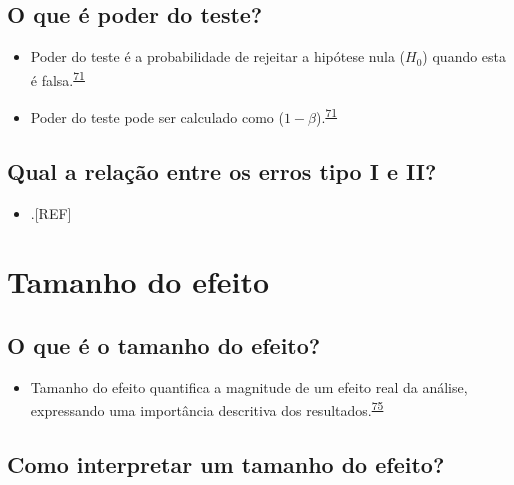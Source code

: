 \documentclass[
]{book}
\providecommand{\tightlist}{%
  \setlength{\itemsep}{0pt}\setlength{\parskip}{0pt}}
\begin{document}
\hypertarget{o-que-uxe9-poder-do-teste}{%
\subsection{O que é poder do teste?}\label{o-que-uxe9-poder-do-teste}}

\begin{itemize}
\item
  Poder do teste é a probabilidade de rejeitar a hipótese nula (\(H_{0}\)) quando esta é falsa.\textsuperscript{\protect\hyperlink{ref-Curran-Everett2009}{71}}
\item
  Poder do teste pode ser calculado como (\(1 - \beta\)).\textsuperscript{\protect\hyperlink{ref-Curran-Everett2009}{71}}
\end{itemize}

\hypertarget{qual-a-relauxe7uxe3o-entre-os-erros-tipo-i-e-ii}{%
\subsection{Qual a relação entre os erros tipo I e II?}\label{qual-a-relauxe7uxe3o-entre-os-erros-tipo-i-e-ii}}

\begin{itemize}
\tightlist
\item
  .{[}REF{]}
\end{itemize}

\hypertarget{tamanho-efeito}{%
\section{Tamanho do efeito}\label{tamanho-efeito}}

\hypertarget{o-que-uxe9-o-tamanho-do-efeito}{%
\subsection{O que é o tamanho do efeito?}\label{o-que-uxe9-o-tamanho-do-efeito}}

\begin{itemize}
\tightlist
\item
  Tamanho do efeito quantifica a magnitude de um efeito real da análise, expressando uma importância descritiva dos resultados.\textsuperscript{\protect\hyperlink{ref-Kim2015}{75}}
\end{itemize}

\hypertarget{como-interpretar-um-tamanho-do-efeito}{%
\subsection{Como interpretar um tamanho do efeito?}\label{como-interpretar-um-tamanho-do-efeito}}
\end{document}
